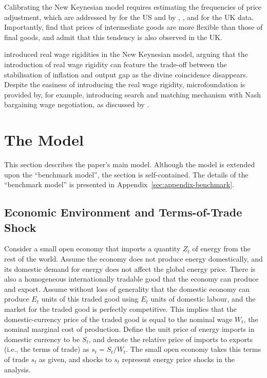 \documentclass[a4paper, 12pt]{article}
\theoremstyle{definition*}
\begin{document}
Calibrating the New Keynesian model requires estimating the frequencies of price adjustment, which are addressed by \cite{nakamura2008five} for the US and by \cite{bunn2012examining}, \cite{bunn2012how}, and \cite{zhou2019determinants} for the UK data.
Importantly, \cite{nakamura2008five} find that prices of intermediate goods are more flexible than those of final goods, and \cite{bunn2012how} admit that this tendency is also observed in the UK.

\cite{blanchard2007real} introduced real wage rigidities in the New Keynesian model, arguing that the introduction of real wage rigidity can feature the trade-off between the stabilisation of inflation and output gap as the divine coincidence disappears.
Despite the easiness of introducing the real wage rigidity, microfoundation is provided by, for example, introducing search and matching mechanism with Nash bargaining wage negotiation, as discussed by \cite{hall2005employment}.

\section{The Model}\label{sec:model}
This section describes the paper's main model.
Although the model is extended upon the ``benchmark model'', the section is self-contained.
The details of the ``benchmark model'' is presented in Appendix~\ref{sec:appendix-benchmark}.

\subsection{Economic Environment and Terms-of-Trade Shock}
Consider a small open economy that imports a quantity $Z_t$ of energy from the rest of the world.
Assume the economy does not produce energy domestically, and its domestic demand for energy does not affect the global energy price.
There is also a homogeneous internationally tradable good that the economy can produce and export.
Assume without loss of generality that the domestic economy can produce $E_t$ units of this traded good using $E_t$ units of domestic labour, and the market for the traded good is perfectly competitive.
This implies that the domestic-currency price of the traded good is equal to the nominal wage $W_t$, the nominal marginal cost of production.
Define the unit price of energy imports in domestic currency to be $S_t$, and denote the relative price of imports to exports (i.e., the terms of trade) as $s_t = S_t / W_t$.
The small open economy takes this terms of trade $s_t$ as given, and shocks to $s_t$ represent energy price shocks in the analysis.
\end{document}
